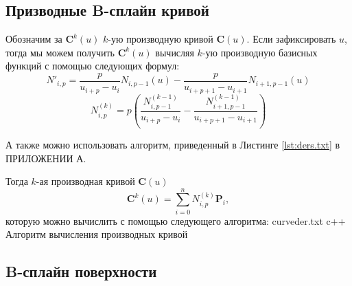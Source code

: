 \documentclass{bmstu}
\begin{document}
\subsection{Призводные B-сплайн кривой}

Обозначим за $\mathbf{C}^{k}(u)$ $k$-ую производную кривой $\mathbf{C}(u)$. Если зафиксировать $u$, тогда мы можем получить $\mathbf{C}^{k}(u)$ вычисляя $k$-ую производную базисных функций с помощью следующих формул:
\begin{equation}
    N'_{i,p}=\frac{p}{u_{i+p}-u_i}N_{i, p-1}(u) - \frac{p}{u_{i+p+1}-u_{i+1}}N_{i+1, p-1}(u)
\end{equation}
\begin{equation}
    N^{(k)}_{i,p}=p\left(\frac{N^{(k-1)}_{i, p-1}}{u_{i+p}-u_i}-\frac{N^{(k-1)}_{i+1, p-1}}{u_{i+p+1}-u_{i+1}}\right)
\end{equation}

А также можно использовать алгоритм, приведенный в Листинге \ref{lst:ders.txt} в ПРИЛОЖЕНИИ А.

Тогда $k$-ая производная кривой $\mathbf{C}(u)$
\begin{equation}\label{BSder}
    \mathbf{C}^{k}(u) = \sum\limits_{i=0}^{n}N^{(k)}_{i,p}\mathbf{P}_i,
\end{equation}
которую можно вычислить с помощью следующего алгоритма:
{curveder.txt} %
{c++} %
{Алгоритм вычисления производных кривой} %

\subsection{B-сплайн поверхности}
\end{document}
